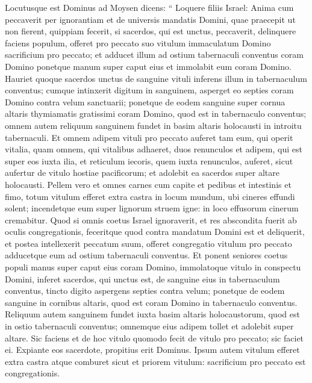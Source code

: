 \begin{biblechapter}
\begin{biblechapter}
\begin{biblechapter}
\begin{biblechapter}
\verse Locutusque est Dominus ad Moysen dicens: 
\verse “ Loquere filiis Israel: Anima cum peccaverit per ignorantiam et de universis mandatis Domini, quae praecepit ut non fierent, quippiam fecerit, 
\verse si sacerdos, qui est unctus, peccaverit, delinquere faciens populum, offeret pro peccato suo vitulum immaculatum Domino sacrificium pro peccato; 
\verse et adducet illum ad ostium tabernaculi conventus coram Domino ponetque manum super caput eius et immolabit eum coram Domino. 
\verse Hauriet quoque sacerdos unctus de sanguine vituli inferens illum in tabernaculum conventus; 
\verse cumque intinxerit digitum in sanguinem, asperget eo septies coram Domino contra velum sanctuarii; 
\verse ponetque de eodem sanguine super cornua altaris thymiamatis gratissimi coram Domino, quod est in tabernaculo conventus; omnem autem reliquum sanguinem fundet in basim altaris holocausti in introitu tabernaculi. 
\verse Et omnem adipem vituli pro peccato auferet tam eum, qui operit vitalia, quam omnem, qui vitalibus adhaeret, 
\verse duos renunculos et adipem, qui est super eos iuxta ilia, et reticulum iecoris, quem iuxta renunculos, auferet, 
\verse sicut aufertur de vitulo hostiae pacificorum; et adolebit ea sacerdos super altare holocausti. 
\verse Pellem vero et omnes carnes cum capite et pedibus et intestinis et fimo, 
\verse totum vitulum efferet extra castra in locum mundum, ubi cineres effundi solent; incendetque eum super lignorum struem igne: in loco effusorum cinerum cremabitur.
 \verse Quod si omnis coetus Israel ignoraverit, et res abscondita fuerit ab oculis congregationis, feceritque quod contra mandatum Domini est et deliquerit, 
\verse et postea intellexerit peccatum suum, offeret congregatio vitulum pro peccato adducetque eum ad ostium tabernaculi conventus. 
\verse Et ponent seniores coetus populi manus super caput eius coram Domino, immolatoque vitulo in conspectu Domini, 
\verse inferet sacerdos, qui unctus est, de sanguine eius in tabernaculum conventus, 
\verse tincto digito aspergens septies contra velum; 
 \verse ponetque de eodem sanguine in cornibus altaris, quod est coram Domino in tabernaculo conventus. Reliquum autem sanguinem fundet iuxta basim altaris holocaustorum, quod est in ostio tabernaculi conventus; 
\verse omnemque eius adipem tollet et adolebit super altare. 
\verse Sic faciens et de hoc vitulo quomodo fecit de vitulo pro peccato; sic faciet ei. Expiante eos sacerdote, propitius erit Dominus. 
\verse Ipsum autem vitulum efferet extra castra atque comburet sicut et priorem vitulum: sacrificium pro peccato est congregationis.

\end{biblechapter}
\end{biblechapter}
\end{biblechapter}
\end{biblechapter}
